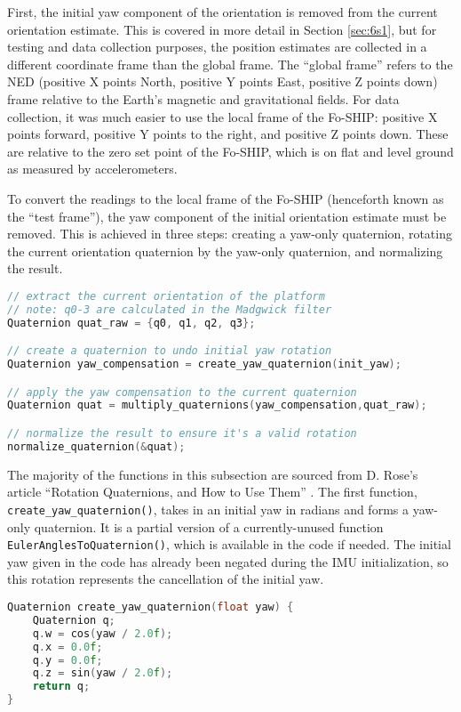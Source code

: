 \documentclass[12pt,a4paper]{report}
\begin{document}
First, the initial yaw component of the orientation is removed from the current orientation estimate. This is covered in more detail in Section \ref{sec:6s1}, but for testing and data collection purposes, the position estimates are collected in a different coordinate frame than the global frame. The “global frame” refers to the NED (positive X points North, positive Y points East, positive Z points down) frame relative to the Earth’s magnetic and gravitational fields. For data collection, it was much easier to use the local frame of the Fo-SHIP: positive X points forward, positive Y points to the right, and positive Z points down. These are relative to the zero set point of the Fo-SHIP, which is on flat and level ground as measured by accelerometers. 

To convert the readings to the local frame of the Fo-SHIP (henceforth known as the “test frame”), the yaw component of the initial orientation estimate must be removed. This is achieved in three steps: creating a yaw-only quaternion, rotating the current orientation quaternion by the yaw-only quaternion, and normalizing the result.

\begin{lstlisting}[language=C++]
// extract the current orientation of the platform
// note: q0-3 are calculated in the Madgwick filter
Quaternion quat_raw = {q0, q1, q2, q3};

// create a quaternion to undo initial yaw rotation
Quaternion yaw_compensation = create_yaw_quaternion(init_yaw);

// apply the yaw compensation to the current quaternion
Quaternion quat = multiply_quaternions(yaw_compensation,quat_raw);

// normalize the result to ensure it's a valid rotation
normalize_quaternion(&quat);
\end{lstlisting}

The majority of the functions in this subsection are sourced from D. Rose’s article “Rotation Quaternions, and How to Use Them” \cite{quaternionuse}. The first function, \verb|create_yaw_quaternion()|, takes in an initial yaw in radians and forms a yaw-only quaternion. It is a partial version of a currently-unused function \verb|EulerAnglesToQuaternion()|, which is available in the code if needed. The initial yaw given in the code has already been negated during the IMU initialization, so this rotation represents the cancellation of the initial yaw.

\begin{lstlisting}[language=C++]
Quaternion create_yaw_quaternion(float yaw) {
	Quaternion q;
	q.w = cos(yaw / 2.0f);
	q.x = 0.0f;
	q.y = 0.0f;
	q.z = sin(yaw / 2.0f);
	return q;
}
\end{lstlisting}
\end{document}
